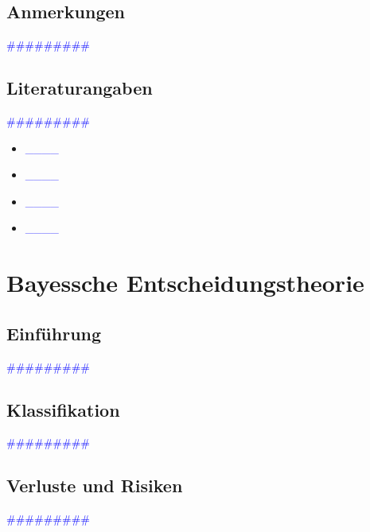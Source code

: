 \documentclass{article}
\begin{document}
  \subsection{Anmerkungen} %
      \textcolor{blue}{\#\#\#\#\#\#\#\#\#}
  \subsection{Literaturangaben} %
      \textcolor{blue}{\#\#\#\#\#\#\#\#\#}

      \begin{itemize}
      \color{red}
        \item  \textcolor{blue}{\_\_\_\_}
        \item  \textcolor{blue}{\_\_\_\_}
      \color{ForestGreen}
        \item  \textcolor{blue}{\_\_\_\_}
        \item  \textcolor{blue}{\_\_\_\_}
      \end{itemize}



\newpage
\section{Bayessche Entscheidungstheorie} %
  \subsection{Einführung} %
      \textcolor{blue}{\#\#\#\#\#\#\#\#\#}
  \subsection{Klassifikation} %
      \textcolor{blue}{\#\#\#\#\#\#\#\#\#}
  \subsection{Verluste und Risiken} %
      \textcolor{blue}{\#\#\#\#\#\#\#\#\#}
\end{document}

